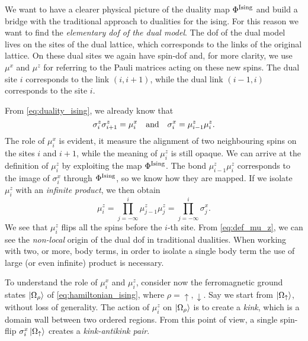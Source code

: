 \begin{figure}[t]
\end{figure}


We want to have a clearer physical picture of the duality map $\Phi^{\text{Ising}}$ and build a bridge with the traditional approach to dualities for the \ac{ising}.
For this reason we want to find the \emph{elementary \ac{dof} of the dual model}.
The \ac{dof} of the dual model lives on the sites of the dual lattice, which corresponds to the links of the original lattice.
On these dual sites we again have spin-\onehalf \ac{dof} and, for more clarity, we use $\mu^x$ and $\mu^z$ for referring to the Pauli matrices acting on these new spins.
The dual site $i$ corresponds to the link $(i, i+1)$, while the dual link $(i-1, i)$  corresponds to the site $i$.

From \eqref{eq:duality_ising}, we already know that
\begin{equation}
    \sigma^z_i \sigma^z_{i+1} = \mu^x_i
    \qand
    \sigma^x_i = \mu^z_{i-1} \mu^z_i.
\end{equation}
The role of $\mu^x_i$ is evident, it measure the alignment of two neighbouring spins on the sites $i$ and $i+1$, while the meaning of $\mu^z_i$ is still opaque.
We can arrive at the definition of $\mu^z_i$ by exploiting the map $\Phi^{\text{Ising}}$.
The bond $\mu^z_{i-1} \mu^z_i$ corresponds to the image of $\sigma^x_i$ through $\Phi^{\text{Ising}}$, so we know how they are mapped.
If we isolate $\mu^z_i$ with an \emph{infinite product}, we then obtain
\begin{equation}
    \mu^z_i
    = \prod_{j = -\infty}^{i} \mu^z_{j-1} \mu^z_j
    = \prod_{j = -\infty}^{i} \sigma^x_j.
    \label{eq:def_mu_z}
\end{equation}
We see that $\mu^z_i$ flips all the spins before the $i$-th site.
From \eqref{eq:def_mu_z}, we can see the \emph{non-local} origin of the dual \ac{dof} in traditional dualities.
When working with two, or more, body terms, in order to isolate a single body term the use of large (or even infinite) product is necessary.

To understand the role of $\mu^x_i$ and $\mu^z_i$, consider now the ferromagnetic ground states $\ket{\Omega_{\rho}}$ of \eqref{eq:hamiltonian_ising}, where $\rho=\uparrow, \downarrow$.
Say we start from $\ket{\Omega_{\uparrow}}$, without loss of generality.
The action of $\mu^z_i$ on $\ket{\Omega_{\rho}}$ is to create a \emph{kink}, which is a domain wall between two ordered regions.
From this point of view, a single spin-flip $\sigma^x_i \ket{\Omega_{\uparrow}}$ creates a \emph{kink-antikink pair}.

